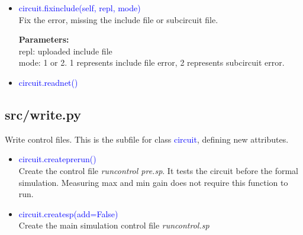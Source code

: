 \documentclass[12pt,a4paper]{article}
\begin{document}
\begin{itemize}[leftmargin=*]
\begin{itemize}
                It will call the ngspice to first perform an operating point analysis. During this process, it will give us all the component and net information.

                If the operation point analysis is passed, it will perform an AC, small-signal frequency response
                analysis.

                \textbf{Return:} two-element tuple(error\textunderscore message, flag).

                flag=0: no error occurs or uncategorized error

                flag=1: include file error. Could not find include file

                flag=2: Unknown subcircuit error.

                If no error occur, both elements are 0.

            \item \textcolor{blue}{circuit.fixinclude(self, repl, mode)}\\
                Fix the error, missing the include file or subcircuit file.

                \textbf{Parameters:}\\
                repl: uploaded include file\\
                mode: 1 or 2. 1 represents include file error, 2 represents subcircuit error.

            \item \textcolor{blue}{circuit.readnet()}

\end{itemize}

\subsection{src/\textunderscore write.py}
Write control files. This is the subfile for class \textcolor{blue}{circuit}, defining new attributes.

\begin{itemize}[leftmargin=*]
    \item \textcolor{blue}{circuit.create\textunderscore prerun()}\\
        Create the control file \textit{run\textunderscore control \textunderscore pre.sp}. It tests the circuit before the formal simulation. Measuring max and min gain does not require this function to run.

    \item \textcolor{blue}{circuit.create\textunderscore sp(add=False)}\\
        Create the main simulation control file \textit{run\textunderscore control.sp}


\end{itemize}
\end{itemize}
\end{document}
